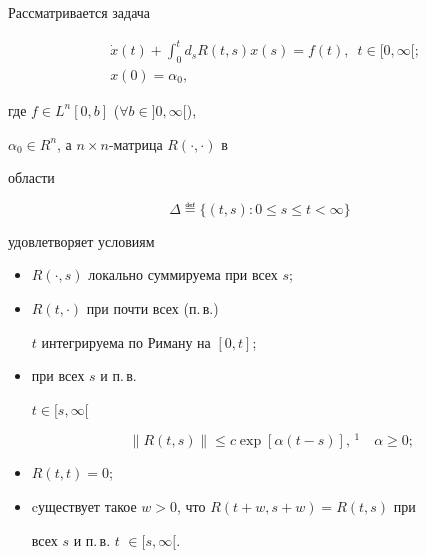 

\maketitle


\label{begin}








Рассматривается задача


\begin{align}


&\Dot x(t)+\displaystyle\int_0^t d_s R(t,s)x(s)=f(t),\ \;t\in [0,\infty[;\\


&x(0)=\alpha_0,


\end{align}


где $f\in L^n[0,b]$ ($\forall b\in]0,\infty[$),


$\alpha_0\in R^n$, а $n\times n$-матрица $R(\cdot,\cdot)$ в


области


$$


\Delta\eqdef\{(t,s):0\le s\le t<\infty\}


$$


удовлетворяет условиям


\begin{itemize}


\item[1)] $R(\cdot,s)$ локально суммируема при всех $s$;


\item[2)] $R(t,\cdot)$ при почти всех (п.\,в.)


$t$ интегрируема по Риману на $[0,t]$;


\item[3)] при всех $s$ и п.\,в.


$t\in[s,\infty[$


\begin{equation}


\|R(t,s)\|\le c\exp[\alpha(t-s)],\,{}^1\quad \alpha\ge0;


\end{equation}


\item[4)] $R(t,t)=0$;


\item[5)] cуществует такое $w>0$, что $R(t+w,s+w)=R(t,s)$ при


всех $s$ и п.\,в. $t$ $\in[s,\infty[$.


\end{itemize}





